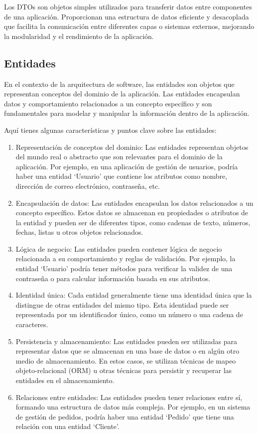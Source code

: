 \documentclass[executivepaper]{article}
\begin{document}
Los DTOs son objetos simples utilizados para transferir datos entre componentes de una aplicación. Proporcionan una estructura de datos eficiente y desacoplada que facilita la comunicación entre diferentes capas o sistemas externos, mejorando la modularidad y el rendimiento de la aplicación.

\subsection{Entidades}

En el contexto de la arquitectura de software, las entidades son objetos que representan conceptos del dominio de la aplicación. Las entidades encapsulan datos y comportamiento relacionados a un concepto específico y son fundamentales para modelar y manipular la información dentro de la aplicación.

Aquí tienes algunas características y puntos clave sobre las entidades:
\begin{enumerate}
    \item Representación de conceptos del dominio: Las entidades representan objetos del mundo real o abstracto que son relevantes para el dominio de la aplicación. Por ejemplo, en una aplicación de gestión de usuarios, podría haber una entidad \enquote*{Usuario} que contiene los atributos como nombre, dirección de correo electrónico, contraseña, etc.
    \item Encapsulación de datos: Las entidades encapsulan los datos relacionados a un concepto específico. Estos datos se almacenan en propiedades o atributos de la entidad y pueden ser de diferentes tipos, como cadenas de texto, números, fechas, listas u otros objetos relacionados.
    \item Lógica de negocio: Las entidades pueden contener lógica de negocio relacionada a su comportamiento y reglas de validación. Por ejemplo, la entidad \enquote*{Usuario} podría tener métodos para verificar la validez de una contraseña o para calcular información basada en sus atributos.
    \item Identidad única: Cada entidad generalmente tiene una identidad única que la distingue de otras entidades del mismo tipo. Esta identidad puede ser representada por un identificador único, como un número o una cadena de caracteres.
    \item Persistencia y almacenamiento: Las entidades pueden ser utilizadas para representar datos que se almacenan en una base de datos o en algún otro medio de almacenamiento. En estos casos, se utilizan técnicas de mapeo objeto-relacional (ORM) u otras técnicas para persistir y recuperar las entidades en el almacenamiento.
    \item Relaciones entre entidades: Las entidades pueden tener relaciones entre sí, formando una estructura de datos más compleja. Por ejemplo, en un sistema de gestión de pedidos, podría haber una entidad \enquote*{Pedido} que tiene una relación con una entidad \enquote*{Cliente}.
\end{enumerate}
\end{document}
